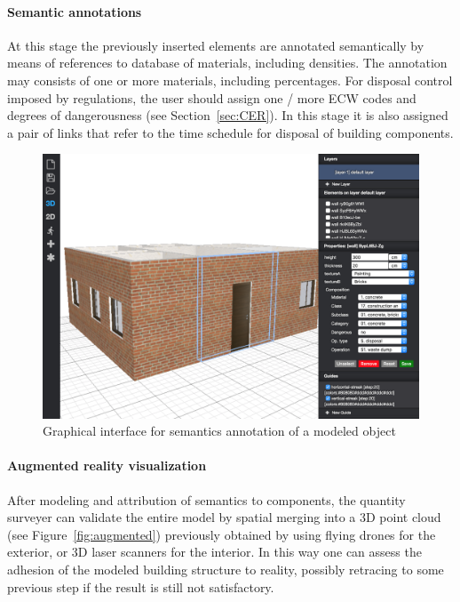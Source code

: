 \vspace{-2mm}\paragraph{Semantic annotations} 
At this stage the previously inserted elements are annotated semantically  by means of references to database of materials, including densities. The annotation may consists of one or more materials, including percentages.
For disposal control imposed by regulations, the user should assign one / more ECW codes and degrees of dangerousness (see Section~\ref{sec:CER}).
In this stage it is also assigned a pair of links that refer to the time schedule for disposal of  building components.

\begin{figure}[!h]
  \centering
  \includegraphics[width=1\linewidth]{images/3d-sel.png}
  \caption{Graphical interface for semantics annotation of a modeled object}
  \label{fig:semantics}
\end{figure}

\vspace{-2mm}\paragraph{Augmented reality visualization} 
After modeling and attribution of semantics to components, the quantity surveyer can validate the entire model by spatial merging into a 3D point cloud (see Figure~\ref{fig:augmented}) previously obtained by using flying drones for the exterior, or 3D laser scanners for the interior. In this way one can assess the adhesion of the modeled building structure to reality, possibly retracing to some previous step if the result is still not satisfactory.

